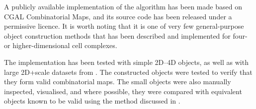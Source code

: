 A publicly available implementation of the algorithm has been made based on CGAL Combinatorial Maps, and its source code has been released under a permissive licence.
It is worth noting that it is one of very few general-purpose object construction methods that has been described and implemented for four- or higher-dimensional cell complexes.

The implementation has been tested with simple 2D--4D objects, as well as with large 2D+scale datasets from \citet{Meijers11}.
The constructed objects were tested to verify that they form valid combinatorial maps.
The small objects were also manually inspected, visualised, and where possible, they were compared with equivalent objects known to be valid using the method discussed in .
